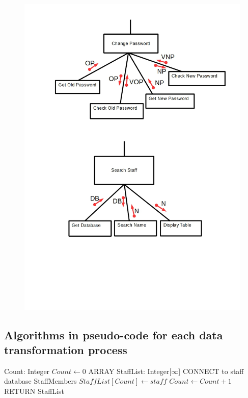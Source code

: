 \begin{figure}[H]
\includegraphics[width=\textwidth]{PS8.jpg}
\caption{}
\end{figure}

\subsection{Algorithms in pseudo-code for each data transformation process}


\begin{algorithm}[H]
\begin{algorithmic}
\State Count: Integer
\State$Count \leftarrow 0$
\State ARRAY StaffList: Integer[$\infty$]
\State CONNECT to staff database
  {StaffMembers}
		\State$StaffList[Count] \leftarrow staff$
		\EndIf
	\State$Count \leftarrow Count + 1$
	\EndFor
\State RETURN StaffList
\EndFunction
\end{algorithmic}
\end{algorithm}

